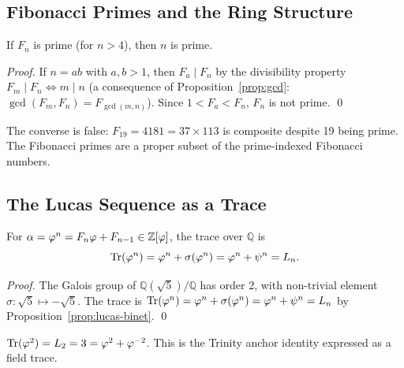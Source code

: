 \subsection{Fibonacci Primes and the Ring Structure}
\label{subsec:ch7-fib-primes}

\begin{proposition}\label{prop:fib-prime}
If \(F_n\) is prime (for \(n > 4\)), then \(n\) is prime.
\end{proposition}

\begin{proof}
If \(n = ab\) with \(a, b > 1\), then \(F_a \mid F_n\) by the divisibility
property \(F_m \mid F_n \Leftrightarrow m \mid n\) (a consequence of
Proposition~\ref{prop:gcd}: \(\gcd(F_m, F_n) = F_{\gcd(m,n)}\)).  Since
\(1 < F_a < F_n\), \(F_n\) is not prime.
\qed
\end{proof}

\begin{remark}
The converse is false: \(F_{19} = 4181 = 37 \times 113\) is composite
despite 19 being prime.  The Fibonacci primes are a proper subset of
the prime-indexed Fibonacci numbers.
\end{remark}

\subsection{The Lucas Sequence as a Trace}
\label{subsec:ch7-lucas-trace}

\begin{proposition}\label{prop:lucas-trace}
For \(\alpha = \varphi^{n} = F_n\varphi + F_{n-1} \in \mathbb{Z}[\varphi]\),
the trace over \(\mathbb{Q}\) is
\[
  \mathrm{Tr}(\varphi^{n}) = \varphi^{n} + \sigma(\varphi^{n})
  = \varphi^{n} + \psi^n = L_n.
\]
\end{proposition}

\begin{proof}
The Galois group of \(\mathbb{Q}(\sqrt{5})/\mathbb{Q}\) has order 2,
with non-trivial element \(\sigma : \sqrt{5} \mapsto -\sqrt{5}\).
The trace is \(\mathrm{Tr}(\varphi^{n}) = \varphi^{n} + \sigma(\varphi^{n})
= \varphi^{n} + \psi^n = L_n\) by Proposition~\ref{prop:lucas-binet}.
\qed
\end{proof}

\begin{corollary}\label{cor:trace-3}
\(\mathrm{Tr}(\varphi^{2}) = L_2 = 3 = \varphi^{2} + \varphi^{-2}\).
This is the Trinity anchor identity expressed as a field trace.
\end{corollary}

